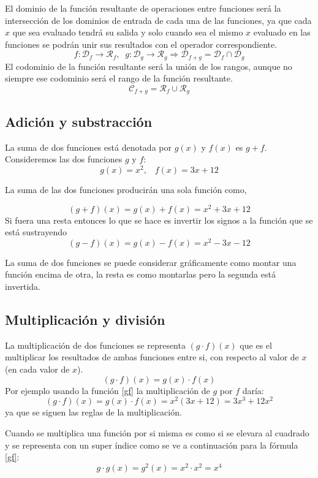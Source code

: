 \documentclass[oneside,spanish,letterpaper]{extbook}
\theoremstyle{mythmstyle}
\begin{document}
El dominio de la función resultante de operaciones entre funciones será la intersección de los
dominios de entrada de cada una de las funciones, ya que cada $x$ que sea evaluado tendrá su salida y solo cuando sea
el mismo $x$ evaluado en las funciones se podrán unir sus resultados con el operador correspondiente.
$$f:\mathscr{D}_f \rightarrow \mathscr{R}_f,\;\;g:\mathscr{D}_g \rightarrow \mathscr{R}_g
\Rightarrow \mathscr{D}_{f+g}= \mathscr{D}_f \cap \mathscr{D}_g$$
El codominio de la función resultante será la unión de los rangos, aunque no siempre ese codominio
será el rango de la función resultante.
$$\mathscr{C}_{f+g}=\mathscr{R}_f \cup \mathscr{R}_g$$


\subsection{Adición y substracción}
La suma de dos funciones está denotada por $g(x)$ y $f(x)$ es $g + f$.
Consideremos las dos funciones $g$ y $f$:
\begin{equation}\label{gf}
 g(x)=x^2,\;\;\;  f(x)=3x+12
\end{equation}



La suma de las dos funciones producirán una sola función como,

$$(g+f)(x)=g(x)+f(x)=x^2+3x+12$$
 Si fuera una resta entonces lo que se hace es invertir los signos a la función que se está sustrayendo
 $$(g-f)(x)=g(x)-f(x)=x^2-3x-12$$
 
 La suma de dos funciones se puede considerar gráficamente como montar una función encima de otra, la resta es 
 como montarlas pero la segunda está invertida.

\subsection{Multiplicación y división}
La multiplicación de dos funciones se representa $(g\cdot f)(x)$ que es el multiplicar los resultados de ambas 
funciones entre si, con respecto al valor de $x$ (en cada valor de $x$). 
$$(g\cdot f)(x)=g(x)\cdot f(x)$$
Por ejemplo usando la función \ref{gf} la multiplicación de $g$ por $f$ daría:
 $$(g\cdot f)(x)=g(x)\cdot f(x)=x^2(3x+12)=3x^3+12x^2$$
 ya que se siguen las reglas de la multiplicación.
 
 Cuando se multiplica una función por si misma es como si se elevara al cuadrado y se representa con un super índice
 como se ve a continuación para la fórmula \ref{gf}:
 $$g\cdot g (x)=g^2(x)=x^2 \cdot x^2=x^4 $$
 
\end{document}
